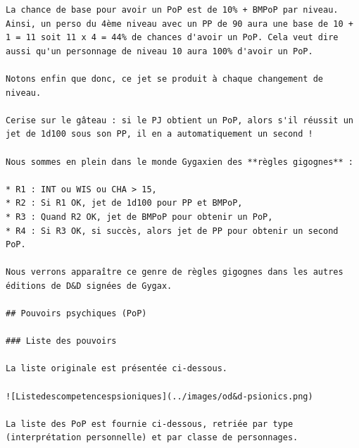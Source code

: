 \documentclass[11pt]{article}
\begin{document}
{\begin{verbatim}
La chance de base pour avoir un PoP est de 10% + BMPoP par niveau. Ainsi, un perso du 4ème niveau avec un PP de 90 aura une base de 10 + 1 = 11 soit 11 x 4 = 44% de chances d'avoir un PoP. Cela veut dire aussi qu'un personnage de niveau 10 aura 100% d'avoir un PoP.

Notons enfin que donc, ce jet se produit à chaque changement de niveau.

Cerise sur le gâteau : si le PJ obtient un PoP, alors s'il réussit un jet de 1d100 sous son PP, il en a automatiquement un second !

Nous sommes en plein dans le monde Gygaxien des **règles gigognes** :

* R1 : INT ou WIS ou CHA > 15,
* R2 : Si R1 OK, jet de 1d100 pour PP et BMPoP,
* R3 : Quand R2 OK, jet de BMPoP pour obtenir un PoP,
* R4 : Si R3 OK, si succès, alors jet de PP pour obtenir un second PoP.

Nous verrons apparaître ce genre de règles gigognes dans les autres éditions de D&D signées de Gygax.

## Pouvoirs psychiques (PoP)

### Liste des pouvoirs

La liste originale est présentée ci-dessous.

![Listedescompetencespsioniques](../images/od&d-psionics.png)

La liste des PoP est fournie ci-dessous, retriée par type (interprétation personnelle) et par classe de personnages.


\end{verbatim}}
\end{document}
